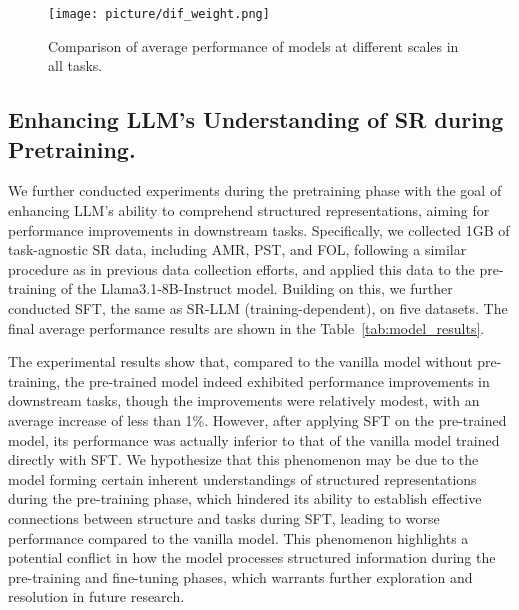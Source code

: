 \begin{figure}[!ht]
\centering
\texttt{[image: picture/dif\_weight.png]}
\caption{Comparison of average performance of models at different scales in all tasks.}
\label{fig:dif_weight}
\vspace{-0.1in}
\end{figure}

\subsection{Enhancing LLM's Understanding of SR during Pretraining.}
We further conducted experiments during the pretraining phase with the goal of enhancing LLM's ability to comprehend structured representations, aiming for performance improvements in downstream tasks. Specifically, we collected 1GB of task-agnostic SR data, including AMR, PST, and FOL, following a similar procedure as in previous data collection efforts, and applied this data to the pre-training of the Llama3.1-8B-Instruct model. Building on this, we further conducted SFT, the same as SR-LLM (training-dependent), on five datasets. The final average performance results are shown in the Table~\ref{tab:model_results}.

The experimental results show that, compared to the vanilla model without pre-training, the pre-trained model indeed exhibited performance improvements in downstream tasks, though the improvements were relatively modest, with an average increase of less than 1\%. However, after applying SFT on the pre-trained model, its performance was actually inferior to that of the vanilla model trained directly with SFT. We hypothesize that this phenomenon may be due to the model forming certain inherent understandings of structured representations during the pre-training phase, which hindered its ability to establish effective connections between structure and tasks during SFT, leading to worse performance compared to the vanilla model. This phenomenon highlights a potential conflict in how the model processes structured information during the pre-training and fine-tuning phases, which warrants further exploration and resolution in future research.



